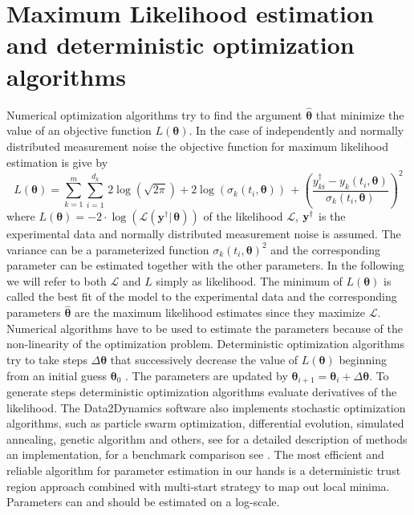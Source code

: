 \documentclass[12pt,a4paper]{scrartcl}
\begin{document}
\section{Maximum Likelihood estimation and deterministic optimization 
algorithms} \label{sec:det_optimization}
Numerical optimization algorithms try to find the argument $\boldsymbol{\hat \theta}$ that 
minimize the value of an objective function $L(\boldsymbol{\theta})$. In the case of 
independently and normally distributed measurement noise the objective function for 
maximum likelihood estimation is give by
\begin{equation}
	L(\boldsymbol{\theta}) = \sum_{k=1}^m \sum_{i=1}^{d_k}\, 2\log(\sqrt{2 \pi}) + 
2\log(\sigma_k(t_i, \boldsymbol{\theta}))\, + \left(\frac{y_{ki}^\dagger - y_{k}(t_{i}, 
\boldsymbol{\theta})}{\sigma_k(t_i, \boldsymbol{\theta})}\right)^2 \label{llhoodfun2}
\end{equation}
where $L(\boldsymbol{\theta}) =  - 2\cdot \log(\mathcal{L}(\mathbf{y}^\dagger|\,
\boldsymbol{\theta}))$ of the likelihood $\mathcal{L}$, ${\bf y}^\dagger$ is the experimental data and normally distributed measurement noise is assumed. The variance can be a 
parameterized function $\sigma_k(t_i, \boldsymbol{\theta})^2$ and the corresponding 
parameter can be estimated together with the other parameters. In the following we will 
refer to both $\mathcal{L}$ and $L$ simply as likelihood. The minimum of 
$L(\boldsymbol{\theta})$ is called the best fit of the model to the experimental data and the 
corresponding parameters $\boldsymbol{\hat \theta}$ are the maximum likelihood 
estimates since they maximize $\mathcal{L}$. Numerical algorithms have to be used to 
estimate the parameters because of the non-linearity of the optimization problem. 
Deterministic optimization algorithms try to take steps $\Delta \boldsymbol{\theta}$ that 
successively decrease the value of $L(\boldsymbol{\theta})$ beginning from an initial 
guess $\boldsymbol{\theta}_0$ \citep{Press:1990rw}. The parameters are updated by $
\boldsymbol{\theta}_{i+1} = \boldsymbol{\theta}_{i} + \Delta \boldsymbol{\theta}$. To 
generate steps deterministic optimization algorithms evaluate derivatives of the likelihood. 
The Data2Dynamics software also implements stochastic optimization algorithms, such as
 particle swarm optimization, differential evolution, simulated annealing, genetic algorithm 
 and others, see \citet{Kronfeld:2010fk} for a detailed description of methods an 
 implementation, for a benchmark comparison see \citet{Raue:2012zt}. The most efficient 
 and reliable algorithm for parameter estimation in our hands is a deterministic trust region 
 approach combined with multi-start strategy to map out local minima. Parameters can and 
 should be estimated on a log-scale.
\end{document}

